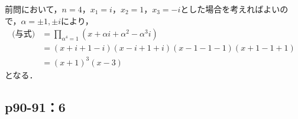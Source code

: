 \documentclass[uplatex,dvipdfmx,a4paper,11pt,fleqn]{jsarticle}
\begin{document}
\begin{leftbar} 
    前問において，$n=4$，$x_1 = i$，$x_2 = 1$，$x_3=-i$とした場合を考えればよいので，$\alpha = \pm 1 , \pm i$により，
    \begin{align*} 
        \text{(与式)} & = \prod_{\alpha^4=1} (x+ \alpha i +\alpha^2 -  \alpha^3i ) \\
        & = (x+i+1-i) (x-i+1+i)(x-1-1-1)(x+1-1+1) \\
        & =(x+1)^3(x-3)
    \end{align*} 
    となる．
\end{leftbar}

\newpage 

\subsection*{p90-91：6}
\end{document}
